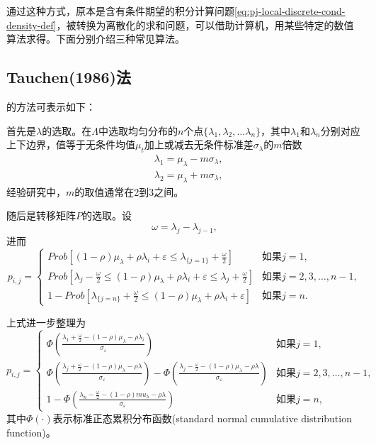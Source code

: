 \begin{subappendices}
通过这种方式，原本是含有条件期望的积分计算问题\eqref{eq:pj-local-discrete-cond-density-def}，被转换为离散化的求和问题，可以借助计算机，用某些特定的数值算法求得。下面分别介绍三种常见算法。

\subsection{Tauchen(1986)法}
\label{sec:pj-local-discretization-tauchen86}

\cite{Tauchen:1986gi}的方法可表示如下：

首先是$\lambda$的选取。在$\Lambda$中选取均匀分布的$n$个点$\{ \lambda_1, \lambda_2, \ldots \lambda_n \}$，其中$\lambda_{1}$和$\lambda_n$分别对应上下边界，值等于无条件均值$\mu_t$加上或减去无条件标准差$\sigma_{\lambda}$的$m$倍数
\begin{align*}
  &\lambda_1 = \mu_{\lambda} - m \sigma_{\lambda},\\
  &\lambda_2 = \mu_{\lambda} + m \sigma_{\lambda},
\end{align*}
经验研究中，$m$的取值通常在2到3之间。

随后是转移矩阵$P$的选取。设
\begin{equation*}
  \omega = \lambda_j - \lambda_{j-1},
\end{equation*}
进而
\begin{equation*}
  p_{i,j} = \begin{cases}
  Prob \left[ (1-\rho) \mu_{\lambda} + \rho \lambda_{i} + \varepsilon \le \lambda_{\{j=1\}}  + \frac{\omega}{2} \right] & \text{如果} j=1,\\
  Prob \left[
  \lambda_j - \frac{\omega}{2} \le (1-\rho) \mu_{\lambda} + \rho \lambda_{i} + \varepsilon \le \lambda_j + \frac{\omega}{2}
  \right] & \text{如果} j=2,3,\ldots,n-1,\\
  1-Prob \left[ \lambda_{\{j=n\}} + \frac{\omega}{2} \le (1-\rho) \mu_{\lambda} + \rho \lambda_{i} + \varepsilon  \right] & \text{如果} j=n.
  \end{cases}
\end{equation*}

上式进一步整理为
\begin{equation*}
  p_{i,j} = \begin{cases}
  \Phi \left( \frac{\lambda_1 + \frac{\omega}{2} - (1-\rho) \mu_{\lambda} - \rho \lambda_i}{\sigma_{\varepsilon}}\right) & \text{如果} j=1,\\
  \Phi \left(
  \frac{
  \lambda_j + \frac{\omega}{2} - (1-\rho) \mu_{\lambda} - \rho \lambda
  }{
  \sigma_{\varepsilon}
  } \right) -
  \Phi \left(
  \frac{
  \lambda_j - \frac{\omega}{2} - (1-\rho) \mu_{\lambda} - \rho \lambda
  }{
  \sigma_{\varepsilon}
  } \right)
   & \text{如果} j=2,3,\ldots,n-1,\\
  1- \Phi \left(
  \frac{
  \lambda_n - \frac{\omega}{2} - (1-\rho) mu_{\lambda} - \rho \lambda
  }{\sigma_{\varepsilon}}
  \right)& \text{如果} j=n,
  \end{cases}
\end{equation*}
其中$\Phi(\cdot)$表示标准正态累积分布函数(standard normal cumulative distribution function)。


\end{subappendices}
